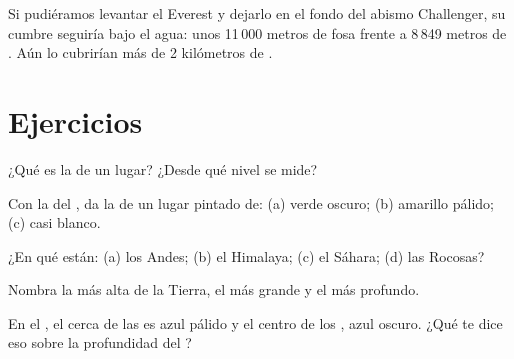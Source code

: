 \begin{example}\label{ex:g4:world-physical-map:everest-in-deep}
Si pudiéramos levantar el Everest y dejarlo en el fondo del abismo
Challenger, su cumbre seguiría bajo el agua: unos 11\,000 metros de fosa
frente a 8\,849 metros de . Aún lo cubrirían más de 2 kilómetros de
.
\end{example}

\section{Ejercicios}

\begin{exercise}[$\star$]\label{exo:g4:world-physical-map:1}
¿Qué es la  de un lugar? ¿Desde qué nivel se mide?
\end{exercise}

\begin{exercise}[$\star$]\label{exo:g4:world-physical-map:2}
Con la  del , da la  de un lugar pintado de:
(a) verde oscuro; (b) amarillo pálido; (c) casi blanco.
\end{exercise}

\begin{exercise}[$\star$]\label{exo:g4:world-physical-map:3}
¿En qué  están: (a) los Andes; (b) el Himalaya; (c) el Sáhara;
(d) las  Rocosas?
\end{exercise}

\begin{exercise}[$\star$]\label{exo:g4:world-physical-map:4}
Nombra la  más alta de la Tierra, el  más grande y el  más
profundo.
\end{exercise}

\begin{exercise}[$\star$]\label{exo:g4:world-physical-map:5}
En el , el  cerca de las  es azul pálido y el centro de
los , azul oscuro. ¿Qué te dice eso sobre la profundidad del ?
\end{exercise}


